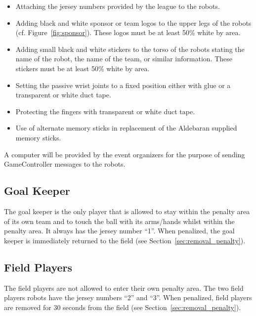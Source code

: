 \documentclass[12pt]{article}
\newcommand{\cf}{\mbox{cf.}\xspace}
\begin{document}
\begin{itemize}

\item Attaching the jersey numbers provided by the league to the robots.

\item Adding black and white sponsor or team logos to the upper legs of the robots (\cf Figure~\ref{fig:sponsor}). These logos must be at least 50\% white by area.

\item Adding small black and white stickers to the torso of the robots stating the name of the robot, the name of the team, or similar information. These stickers must be at least 50\% white by area.

\item Setting the passive wrist joints to a fixed position either with glue or a transparent or white duct tape.

\item Protecting the fingers with transparent or white duct tape.

\item Use of alternate memory sticks in replacement of the Aldebaran supplied memory sticks.

\end{itemize}

A computer will be provided by the event organizers for the purpose of sending GameController messages to the robots.

\subsection{Goal Keeper}
\label{sec:goal_keeper}

The goal keeper is the only player that is allowed to stay within the penalty area of its own team and to touch the ball with its arms/hands whilst within the penalty area. It always has the jersey number ``1''. When penalized, the goal keeper is immediately returned to the field (see Section~\ref{sec:removal_penalty}).

\subsection{Field Players}
\label{sec:field_players}

The field players are not allowed to enter their own penalty area. The two field players robots have the jersey numbers ``2'' and ``3''. When penalized, field players are removed for 30 seconds from the field (see Section~\ref{sec:removal_penalty}).
\end{document}
